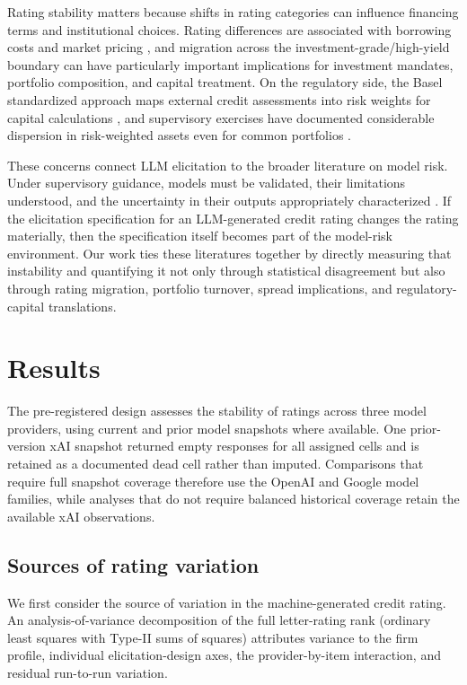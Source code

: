 \documentclass[pdflatex,sn-nature,lineno]{sn-jnl}
\theoremstyle{thmstyleone}
\begin{document}
Rating stability matters because shifts in rating categories can influence financing terms and
institutional choices. Rating differences are associated with borrowing costs and
market pricing \cite{kligersarig2000,tang2009,cornaggia2018}, and migration across the
investment-grade/high-yield boundary can have particularly important implications for investment
mandates, portfolio composition, and capital treatment. On the regulatory side, the Basel standardized
approach maps external credit assessments into risk weights for capital calculations
\cite{bcbs2019cre20}, and supervisory exercises have documented considerable dispersion in risk-weighted
assets even for common portfolios \cite{bcbs2013rcap}.

These concerns connect LLM elicitation to the broader literature on model risk. Under supervisory
guidance, models must be validated, their limitations understood, and the uncertainty in their outputs
appropriately characterized \cite{srletter2011}. If the elicitation specification for an LLM-generated
credit rating changes the rating materially, then the specification itself becomes part of the model-risk
environment. Our work ties these literatures together by directly measuring that instability and
quantifying it not only through statistical disagreement but also through rating migration, portfolio
turnover, spread implications, and regulatory-capital translations.

\section{Results}
The pre-registered design assesses the stability of ratings across three model providers, using current
and prior model snapshots where available. One prior-version xAI snapshot returned empty responses for
all assigned cells and is retained as a documented dead cell rather than imputed. Comparisons that require
full snapshot coverage therefore use the OpenAI and Google model families, while analyses that do not
require balanced historical coverage retain the available xAI observations.

\subsection{Sources of rating variation}
We first consider the source of variation in the machine-generated credit rating. An
analysis-of-variance decomposition of the full letter-rating rank (ordinary least squares with Type-II
sums of squares) attributes variance to the firm profile, individual elicitation-design axes, the
provider-by-item interaction, and residual run-to-run variation.
\end{document}
